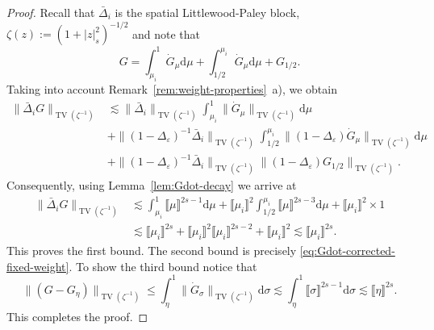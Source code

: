 \documentclass{article}
\numberwithin{equation}{section}
\newcommand{\assign}{:=}
\newcommand{\mathd}{\mathrm{d}}
\theoremstyle{plain}
\theoremstyle{definition}
\begin{document}
\begin{proof}
  Recall that $\bar{\Delta}_i $ is the spatial Littlewood-Paley block, $\zeta
  (z) \assign (1 + | z |^2_s)^{- 1 / 2}$ and note that
  \[ G = \int_{\mu_i}^1 \dot{G}_{\mu} \mathd \mu + \int_{1 / 2}^{\mu_i}
     \dot{G}_{\mu} \mathd \mu + G_{1 / 2} . \]
  Taking into account Remark~\ref{rem:weight-properties}~a), we obtain
  \[ \begin{aligned}
       \| \bar{\Delta}_i  G \|_{\operatorname{TV} (\zeta^{- 1})} & \lesssim  \|
       \bar{\Delta}_i  \|_{\operatorname{TV} (\zeta^{- 1})} \int_{\mu_i}^1 \|
       \dot{G}_{\mu} \|_{\operatorname{TV} (\zeta^{- 1})} \mathd \mu\\
       &   + \| (1 - \Delta_{\varepsilon})^{- 1} \bar{\Delta}_i
       \|_{\operatorname{TV} (\zeta^{- 1})} \int_{1 / 2}^{\mu_i} \| (1 -
       \Delta_{\varepsilon}) \dot{G}_{\mu} \|_{\operatorname{TV} (\zeta^{- 1})} \mathd
       \mu\\
       &   + \| (1 - \Delta_{\varepsilon})^{- 1} \bar{\Delta}_i
       \|_{\operatorname{TV} (\zeta^{- 1})}  \| (1 - \Delta_{\varepsilon}) G_{1 / 2}
       \|_{\operatorname{TV} (\zeta^{- 1})} .
     \end{aligned} \]
  Consequently, using Lemma~\ref{lem:Gdot-decay} we arrive at
  \[ \begin{aligned}
       \| \bar{\Delta}_i  G \|_{\operatorname{TV} (\zeta^{- 1})} & \lesssim
       \int_{\mu_i}^1 \llbracket \mu  \rrbracket^{2 s - 1} \mathd \mu +
       \llbracket \mu_i \rrbracket^2 \int_{1 / 2}^{\mu_i} {\llbracket \mu
       \rrbracket }^{2 s - 3} \mathd \mu + \llbracket \mu_i \rrbracket^2
       \times 1\\
       & \lesssim  \llbracket \mu_i \rrbracket_{}^{2 s} + \llbracket \mu_i
       \rrbracket_{}^2  \llbracket \mu_i \rrbracket ^{2 s - 2} + \llbracket
       \mu_i \rrbracket^2 \lesssim \llbracket \mu_i \rrbracket_{}^{2 s} .
     \end{aligned} \]
  This proves the first bound. 
  The second bound is precisely
  \eqref{eq:Gdot-corrected-fixed-weight}.
  To show the third bound notice that
  \[ \| (G - G_{\eta}) \|_{\operatorname{TV} (\zeta^{- 1})} \leqslant \int_{\eta}^1 \|
     \dot{G}_{\sigma} \|_{\operatorname{TV} (\zeta^{- 1})} \mathd \sigma \lesssim
     \int_{\eta}^1 \llbracket \sigma \rrbracket^{2 s - 1} \mathd \sigma
     \lesssim \llbracket \eta \rrbracket^{2 s} . \]
  This completes the proof.
\end{proof}
\end{document}
